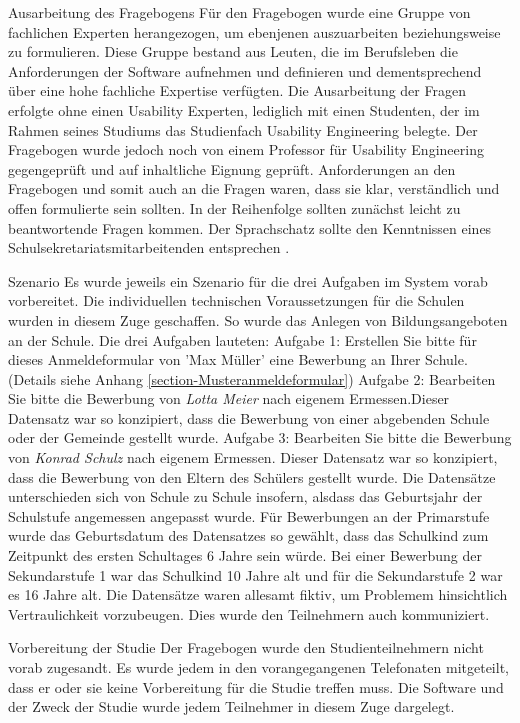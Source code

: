 Ausarbeitung des Fragebogens
Für den Fragebogen wurde eine Gruppe von fachlichen Experten herangezogen, um ebenjenen auszuarbeiten beziehungsweise zu formulieren. Diese Gruppe bestand aus Leuten, die im Berufsleben die Anforderungen der Software aufnehmen und definieren und dementsprechend über eine hohe fachliche Expertise verfügten. Die Ausarbeitung der Fragen erfolgte ohne einen Usability Experten, lediglich mit einen Studenten, der im Rahmen seines Studiums das Studienfach \glqq Usability Engineering\grqq{} belegte. Der Fragebogen wurde jedoch noch von einem Professor für Usability Engineering gegengeprüft und auf inhaltliche Eignung geprüft. 
Anforderungen an den Fragebogen und somit auch an die Fragen waren, dass sie klar, verständlich und offen formulierte sein sollten. In der Reihenfolge sollten zunächst leicht zu beantwortende Fragen kommen. Der Sprachschatz sollte den Kenntnissen eines Schulsekretariatsmitarbeitenden entsprechen \cite{Kruse_2015}. 

Szenario
Es wurde jeweils ein Szenario für die drei Aufgaben im System vorab vorbereitet. Die individuellen technischen Voraussetzungen für die Schulen wurden in diesem Zuge geschaffen. So wurde das Anlegen von Bildungsangeboten an der Schule. Die drei Aufgaben lauteten:
Aufgabe 1: \glqq Erstellen Sie bitte für dieses Anmeldeformular von 'Max Müller' eine Bewerbung an Ihrer Schule.\glqq  (Details siehe Anhang \ref{section-Musteranmeldeformular})
Aufgabe 2: \glqq Bearbeiten Sie bitte die Bewerbung von \textit{Lotta Meier} nach eigenem Ermessen.\glqq  Dieser Datensatz war so konzipiert, dass die Bewerbung von einer abgebenden Schule oder der Gemeinde gestellt wurde.
Aufgabe 3: \glqq Bearbeiten Sie bitte die Bewerbung von \textit{Konrad Schulz} nach eigenem Ermessen\grqq{}. Dieser Datensatz war so konzipiert, dass die Bewerbung von den Eltern des Schülers gestellt wurde.
Die Datensätze unterschieden sich von Schule zu Schule insofern, alsdass das Geburtsjahr der Schulstufe angemessen angepasst wurde. Für Bewerbungen an der Primarstufe wurde das Geburtsdatum des Datensatzes so gewählt, dass das Schulkind zum Zeitpunkt des ersten Schultages 6 Jahre sein würde. Bei einer Bewerbung der Sekundarstufe 1 war das Schulkind 10 Jahre alt und für die Sekundarstufe 2 war es 16 Jahre alt. Die Datensätze waren allesamt fiktiv, um Problemem hinsichtlich Vertraulichkeit vorzubeugen. Dies wurde den Teilnehmern auch kommuniziert.

Vorbereitung der Studie 
Der Fragebogen wurde den Studienteilnehmern nicht vorab zugesandt. Es wurde jedem in den vorangegangenen Telefonaten mitgeteilt, dass er oder sie keine Vorbereitung für die Studie treffen muss. Die Software und der Zweck der Studie wurde jedem Teilnehmer in diesem Zuge dargelegt.

